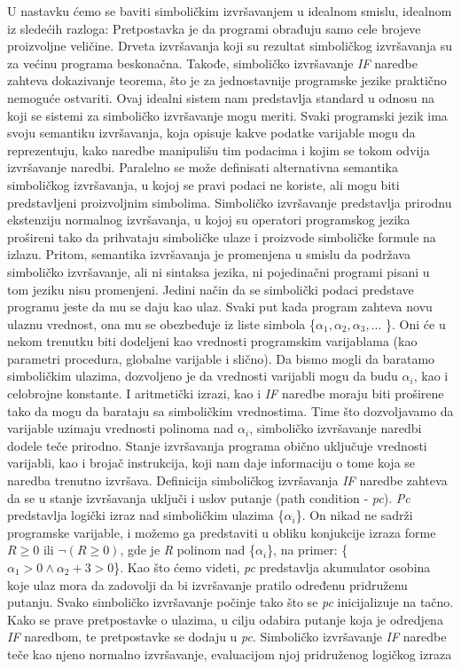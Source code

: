 \documentclass[a4paper]{article}
\begin{document}
U nastavku ćemo se baviti simboličkim izvršavanjem u idealnom smislu, idealnom iz sledećih razloga:
Pretpostavka je da programi obrađuju samo cele brojeve proizvoljne veličine. Drveta izvršavanja koji su rezultat simboličkog izvršavanja su za većinu programa beskonačna. Takođe, simboličko izvršavanje \textit{IF} naredbe zahteva dokazivanje teorema, što je za jednostavnije programske jezike praktično nemoguće ostvariti. Ovaj idealni sistem nam predstavlja standard u odnosu na koji se sistemi za simboličko izvršavanje mogu meriti. Svaki programski jezik ima svoju semantiku izvršavanja, koja opisuje kakve podatke varijable mogu da reprezentuju, kako naredbe manipulišu tim podacima i kojim se tokom odvija  izvršavanje naredbi. Paralelno se može definisati alternativna semantika simboličkog izvršavanja, u kojoj se pravi podaci ne koriste, ali mogu biti predstavljeni proizvoljnim simbolima. Simboličko izvršavanje predstavlja prirodnu ekstenziju normalnog izvršavanja, u kojoj su operatori programskog jezika prošireni tako da prihvataju simboličke ulaze i proizvode simboličke formule na izlazu. Pritom, semantika izvršavanja je promenjena u smislu da podržava simboličko izvršavanje, ali ni sintaksa jezika, ni pojedinačni programi pisani u tom jeziku nisu promenjeni. Jedini način da se simbolički podaci predstave programu jeste da mu se daju kao ulaz. Svaki put kada program zahteva novu ulaznu vrednost, ona mu se obezbeđuje iz liste simbola \{$\alpha_1, \alpha_2, \alpha_3, ... $ \}. Oni će u nekom trenutku biti dodeljeni kao vrednosti programskim varijablama (kao parametri procedura, globalne varijable i slično). Da bismo mogli da baratamo simboličkim ulazima, dozvoljeno je da vrednosti varijabli mogu da budu $\alpha_i$, kao i celobrojne konstante. I aritmetički izrazi, kao i \textit{IF} naredbe moraju biti proširene tako da mogu da barataju sa simboličkim vrednostima. Time što dozvoljavamo da varijable uzimaju vrednosti polinoma nad $\alpha_i$, simboličko izvršavanje naredbi dodele teče prirodno.
Stanje izvršavanja programa obično uključuje vrednosti varijabli, kao i brojač instrukcija, koji nam daje informaciju o tome koja se naredba trenutno izvršava. Definicija simboličkog izvršavanja \textit{IF} naredbe zahteva da se u stanje izvršavanja uključi i uslov putanje (path condition - \textit{pc}). \textit{Pc} predstavlja logički izraz nad simboličkim ulazima \{$\alpha_i$\}. On nikad ne sadrži programske varijable, i možemo ga predstaviti u obliku konjukcije izraza forme $R \ge 0$ ili  $\neg(R \ge 0)$, gde je \textit{R} polinom nad \{$\alpha_i$\}, na primer:  \{$\alpha_1 > 0 \wedge  \alpha_2 + 3 > 0 $\}. Kao što ćemo videti,  \textit{pc} predstavlja akumulator osobina koje ulaz mora da zadovolji da bi izvršavanje pratilo određenu pridruženu putanju. Svako simboličko izvršavanje počinje tako što se \textit{pc} inicijalizuje na tačno. Kako se prave pretpostavke o ulazima, u cilju odabira putanje koja je odredjena \textit{IF} naredbom, te pretpostavke se dodaju u \textit{pc}. Simboličko izvršavanje \textit{IF} naredbe teče kao njeno normalno izvršavanje, evaluacijom njoj pridruženog logičkog izraza 
\end{document}
